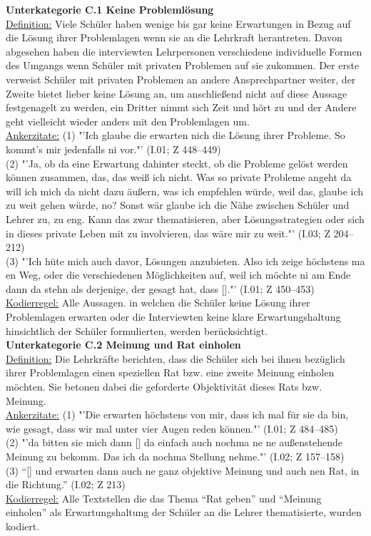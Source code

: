 \noindent
\textbf{Unterkategorie C.1 Keine Problemlösung}\\
\underline{Definition:} Viele Schüler haben wenige bis gar keine Erwartungen in Bezug auf die Lösung ihrer Problemlagen wenn sie an die Lehrkraft herantreten. Davon abgesehen haben die interviewten Lehrpersonen verschiedene individuelle Formen des Umgangs wenn Schüler mit privaten Problemen auf sie zukommen. Der erste verweist Schüler mit privaten Problemen an andere Ansprechpartner weiter, der Zweite bietet lieber keine Lösung an, um anschließend nicht auf diese Aussage festgenagelt zu werden, ein Dritter nimmt sich Zeit und hört zu und der Andere geht vielleicht wieder anders mit den Problemlagen um.\\
\underline{Ankerzitate:} (1) "'Ich glaube die erwarten nich die Lösung ihrer Probleme. So kommt's mir jedenfalls ni vor."' (I.01; Z 448--449)\\ (2) "'Ja, ob da eine Erwartung dahinter steckt, ob die Probleme gelöst werden können zusammen, das, das weiß ich nicht. Was so private Probleme angeht da will ich mich da nicht dazu äußern, was ich empfehlen würde, weil das, glaube ich zu weit gehen würde, no? Sonst wär glaube ich die Nähe zwischen Schüler und Lehrer zu, zu eng. Kann das zwar thematisieren, aber Lösungsstrategien oder sich in dieses private Leben mit zu involvieren, das wäre mir zu weit."' (I.03; Z 204--212)\\ (3) "'Ich hüte mich auch davor, Lösungen anzubieten. Also ich zeige höchstens ma en Weg, oder die verschiedenen Möglichkeiten auf, weil ich möchte ni am Ende dann da stehn als derjenige, der gesagt hat, dass [\punkte]."' (I.01; Z 450--453)\\
\underline{Kodierregel:} Alle Aussagen. in welchen die Schüler keine Lösung ihrer Problemlagen erwarten oder die Interviewten keine klare Erwartungshaltung hinsichtlich der Schüler formulierten, werden berücksichtigt.\\

\noindent
\textbf{Unterkategorie C.2 Meinung und Rat einholen}\\
\underline{Definition:} Die Lehrkräfte berichten, dass die Schüler sich bei ihnen bezüglich ihrer Problemlagen einen speziellen Rat bzw. eine zweite Meinung einholen möchten. Sie betonen dabei die geforderte Objektivität dieses Rats bzw. Meinung.\\
\underline{Ankerzitate:} (1) "'Die erwarten höchstens von mir, dass ich mal für sie da bin, wie gesagt, dass wir mal unter vier Augen reden können."' (I.01; Z 484--485)\\ (2) "'da bitten sie mich dann [\punkte] da einfach auch nochma ne ne außenstehende Meinung zu bekomm. Das ich da nochma Stellung nehme."' (I.02; Z 157--158)\\ (3) "`[\punkte] und erwarten dann auch ne ganz objektive Meinung und auch nen Rat, in die Richtung."' (I.02; Z 213)\\
\underline{Kodierregel:} Alle Textstellen die das Thema "`Rat geben"' und "`Meinung einholen"' als Erwartungshaltung der Schüler an die Lehrer thematisierte, wurden kodiert. \\

